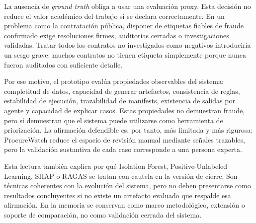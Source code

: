 \documentclass[11pt,a4paper,spanish]{book}
\numberwithin{equation}{chapter}
\numberwithin{figure}{chapter}
\begin{document}
La ausencia de \textit{ground truth} obliga a usar una evaluaci{\'o}n proxy. Esta decisi{\'o}n no reduce
el valor acad{\'e}mico del trabajo si se declara correctamente. En un problema como la contrataci{\'o}n
p{\'u}blica, disponer de etiquetas fiables de fraude confirmado exige resoluciones firmes, auditor{\'i}as
cerradas o investigaciones validadas. Tratar todos los contratos no investigados como negativos
introducir{\'i}a un sesgo grave: muchos contratos no tienen etiqueta simplemente porque nunca fueron
auditados con suficiente detalle.

Por ese motivo, el prototipo eval{\'u}a propiedades observables del sistema: completitud de datos, capacidad
de generar artefactos, consistencia de reglas, estabilidad de ejecuci{\'o}n, trazabilidad de manifests,
existencia de salidas por agente y capacidad de explicar casos. Estas propiedades no demuestran
fraude, pero s{\'i} demuestran que el sistema puede utilizarse como herramienta de priorizaci{\'o}n.
La afirmaci{\'o}n defendible es, por tanto, m{\'a}s limitada y m{\'a}s rigurosa: ProcureWatch reduce el
espacio de revisi{\'o}n manual mediante se{\~n}ales trazables, pero la validaci{\'o}n sustantiva de cada
caso corresponde a una persona experta.

Esta lectura tambi{\'e}n explica por qu{\'e} Isolation Forest, Positive-Unlabeled Learning, SHAP o RAGAS
se tratan con cautela en la versi{\'o}n de cierre. Son t{\'e}cnicas coherentes con la evoluci{\'o}n del
sistema, pero no deben presentarse como resultados concluyentes si no existe un artefacto evaluado
que respalde esa afirmaci{\'o}n. En la memoria se conservan como marco metodol{\'o}gico, extensi{\'o}n o
soporte de comparaci{\'o}n, no como validaci{\'o}n cerrada del sistema.


\end{document}

